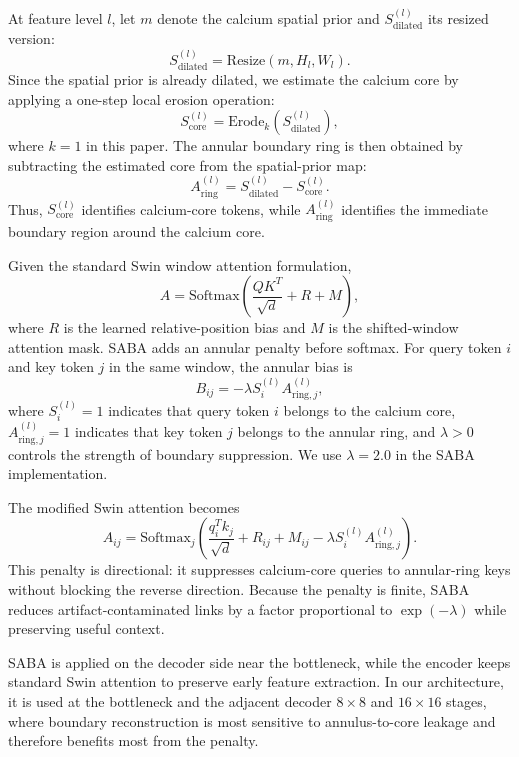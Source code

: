 \documentclass[singleLetter,times]{sagej}
\begin{document}
At feature level $l$, let $m$ denote the calcium spatial prior and $S_{\mathrm{dilated}}^{(l)}$ its resized version:
\[
S_{\mathrm{dilated}}^{(l)}
=
\mathrm{Resize}(m,H_l,W_l).
\]
Since the spatial prior is already dilated, we estimate the calcium core by applying a one-step local erosion operation:
\[
S_{\mathrm{core}}^{(l)}
=
\mathrm{Erode}_{k}
\left(
S_{\mathrm{dilated}}^{(l)}
\right),
\]
where $k=1$ in this paper. The annular boundary ring is then obtained by subtracting the estimated core from the spatial-prior map:
\[
A_{\mathrm{ring}}^{(l)}
=
S_{\mathrm{dilated}}^{(l)}
-
S_{\mathrm{core}}^{(l)}.
\]
Thus, $S_{\mathrm{core}}^{(l)}$ identifies calcium-core tokens, while $A_{\mathrm{ring}}^{(l)}$ identifies the immediate boundary region around the calcium core.

Given the standard Swin window attention formulation,
\[
A
=
\mathrm{Softmax}
\left(
\frac{QK^{T}}{\sqrt{d}}
+
R
+
M
\right),
\]
where $R$ is the learned relative-position bias and $M$ is the shifted-window attention mask. SABA adds an annular penalty before softmax. For query token $i$ and key token $j$ in the same window, the annular bias is
\[
B_{ij}
=
-\lambda S_i^{(l)} A_{\mathrm{ring},j}^{(l)},
\]
where $S_i^{(l)}=1$ indicates that query token $i$ belongs to the calcium core, $A_{\mathrm{ring},j}^{(l)}=1$ indicates that key token $j$ belongs to the annular ring, and $\lambda>0$ controls the strength of boundary suppression. We use $\lambda=2.0$ in the SABA implementation.

The modified Swin attention becomes
\[
A_{ij}
=
\mathrm{Softmax}_{j}
\left(
\frac{q_i^{T}k_j}{\sqrt{d}}
+
R_{ij}
+
M_{ij}
-
\lambda S_i^{(l)} A_{\mathrm{ring},j}^{(l)}
\right).
\]
This penalty is directional: it suppresses calcium-core queries to annular-ring keys without blocking the reverse direction. Because the penalty is finite, SABA reduces artifact-contaminated links by a factor proportional to $\exp(-\lambda)$ while preserving useful context.

SABA is applied on the decoder side near the bottleneck, while the encoder keeps standard Swin attention to preserve early feature extraction. In our architecture, it is used at the bottleneck and the adjacent decoder $8\times8$ and $16\times16$ stages, where boundary reconstruction is most sensitive to annulus-to-core leakage and therefore benefits most from the penalty.
\end{document}
